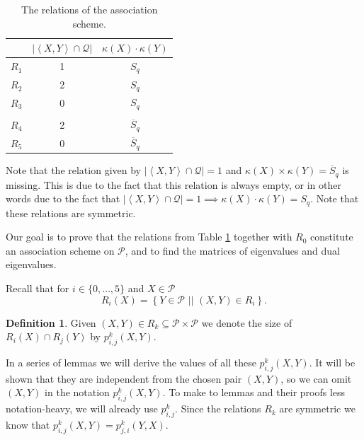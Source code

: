 \documentclass[a4paper]{article}
\theoremstyle{definition}
\newtheorem{df}[thm]{Definition}
\newcommand{\vspan}[1]{\left \langle #1 \right \rangle}
\newcommand{\sett}[2]{ \left\{ #1 \, \, || \, \, #2 \right \} }
\newcommand{\pp}{\mathcal P}
\newcommand{\mq}{\mathcal Q}
\newcommand{\ns}{\overline S}
\begin{document}
\begin{table}[!ht]
    \centering
    \begin{tabular}{c||c|c}
      & $| \vspan{X,Y} \cap \mq |$ & $\kappa(X) \cdot \kappa(Y)$ \\ \hline \hline
     $R_1$ & 1 & $S_q$ \\
     $R_2$ & 2 & $S_q$ \\
     $R_3$ & 0 & $S_q$ \\ [.2em] \hline & &\\ [-1em]
     $R_4$ & 2 & $\ns_q$ \\
     $R_5$ & 0 & $\ns_q$
    \end{tabular}
    \caption{The relations of the association scheme.}
    \label{tab:rel}
\end{table}

Note that the relation given by $|\vspan{X,Y} \cap \mq| = 1$ and $\kappa(X) \times \kappa(Y) = \ns_q$ is missing.
This is due to the fact that this relation is always empty, or in other words due to the fact that 
\(
 |\vspan{X,Y} \cap \mq| = 1 \implies \kappa(X) \cdot \kappa(Y) = S_q
\). Note that these relations are symmetric.

Our goal is to prove that the relations from Table \ref{tab:rel} together with $R_0$ constitute an association scheme on $\pp$, and to find the matrices of eigenvalues and dual eigenvalues.

Recall that
for $i \in \{0, \ldots, 5\}$ and $X \in \pp$
\[
 R_i(X) = \sett{Y \in \pp}{(X,Y) \in R_i}.
\]

\begin{df}
    Given $(X,Y)\in R_{k}\subseteq\pp\times\pp$ we denote the size of $R_i(X) \cap R_j(Y)$ by $p^{k}_{i,j}(X,Y)$.
\end{df}

In a series of lemmas we will derive the values of all these $p^{k}_{i,j}(X,Y)$. It will be shown that they are independent from the chosen pair $(X,Y)$, so we can omit $(X,Y)$ in the notation $p^{k}_{i,j}(X,Y)$. To make to lemmas and their proofs less notation-heavy, we will already use $p^{k}_{i,j}$. Since the relations $R_{k}$ are symmetric we know that $p^{k}_{i,j}(X,Y) = p^{k}_{j,i}(Y,X)$.
\end{document}
